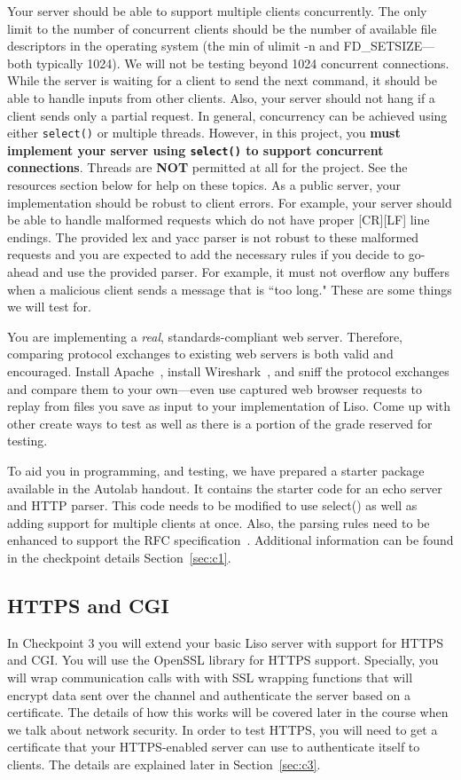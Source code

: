 Your server should be able to support multiple clients concurrently. The only
limit to the number of concurrent clients should be the number of available
file descriptors in the operating system (the min of ulimit -n and
FD\_SETSIZE---both typically 1024). We will not be testing beyond 1024 concurrent connections. While the server is waiting for a client to
send the next command, it should be able to handle inputs from other clients.
Also, your server should not hang if a client sends only a partial request.
In general, concurrency can be achieved using either \texttt{select()} or
multiple threads. However, in this project, you \textbf{must implement your
server using \texttt{select()} to support concurrent connections}. Threads are
\textbf{NOT} permitted at all for the project.  See the resources section below
for help on these topics.  As a public server, your implementation should be
robust to client errors. For example, your server should be able to handle
malformed requests which do not have proper [CR][LF] line endings. The provided lex and yacc parser is not robust to these malformed requests and you are expected to add the necessary rules if you decide to go-ahead and use the provided parser. For example, it must not
overflow any buffers when a malicious client sends a message that is ``too long." These are some things we will test for.

You are implementing a \emph{real}, standards-compliant web server.  Therefore,
comparing protocol exchanges to existing web servers is both valid and
encouraged.  Install Apache~\cite{apache}, install Wireshark~\cite{wireshark}, and
sniff the protocol exchanges and compare them to your own---even use captured web
browser requests to replay from files you save as input to your implementation
of Liso. Come up with other create ways to test as well as there is a portion of the grade reserved for testing.

To aid you in programming, and testing, we have prepared a starter package available in the Autolab handout.  It contains the starter code for an echo server and HTTP parser. This code needs to be modified to use select() as well as adding support for multiple clients at once. Also, the parsing rules need to be enhanced to support the RFC specification~\cite{httprfc}. Additional information can be found in the checkpoint details Section~\ref{sec:c1}. 

\subsection{HTTPS and CGI}
In Checkpoint 3 you will extend your basic Liso server with support for HTTPS and CGI.  You will use the OpenSSL library for HTTPS support.  Specially, you will wrap communication calls with with SSL wrapping functions that will encrypt data sent over the channel and authenticate the server based on a certificate.  The details of how this works will be covered later in the course when we talk about network security.  In order to test HTTPS, you will need to get a certificate that your HTTPS-enabled server can use to authenticate itself to clients.  The details are explained later in Section~\ref{sec:c3}.

